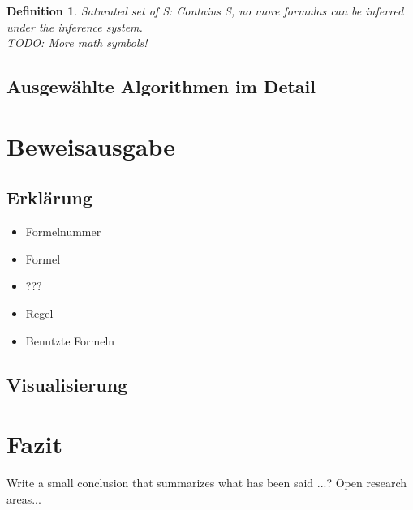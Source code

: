 \documentclass{acm_proc_article-sp-german}
\newtheorem{satset}{Definition}
\begin{document}
\begin{satset}
	Saturated set of S: Contains S, no more formulas can be inferred under the inference system.\\
	TODO: More math symbols!
\end{satset}

\subsection{Ausgewählte Algorithmen im Detail}
\label{subsec:algos}


\section{Beweisausgabe}
\label{sec:output}


\subsection{Erklärung}
\label{subsec:outputexplained}

\begin{itemize}
\item Formelnummer
\item Formel
\item ???
\item Regel
\item Benutzte Formeln

\end{itemize}

\subsection{Visualisierung}
\label{subsec:outputvis}

\section{Fazit}
\label{sec:conclusion}
Write a small conclusion that summarizes what has been said ...?
Open research areas...




\end{document}
